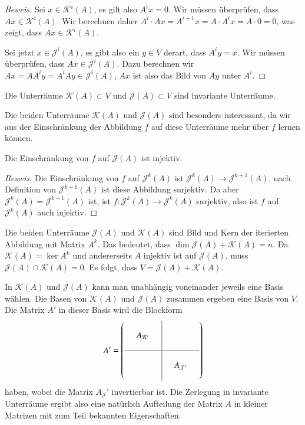 \begin{proof}[Beweis]
Sei $x\in\mathcal{K}^i(A)$, es gilt also $A^ix=0$.
Wir müssen überprüfen, dass $Ax\in\mathcal{K}^i(A)$.
Wir berechnen daher $A^i\cdot Ax=A^{i+1}x=A\cdot A^ix = A\cdot 0=0$,
was zeigt, dass $Ax\in\mathcal{K}^i(A)$.

Sei jetzt $x\in\mathcal{J}^i(A)$, es gibt also ein $y\in V$ derart, dass
$A^iy=x$.
Wir müssen überprüfen, dass $Ax\in\mathcal{J}^i(A)$.
Dazu berechnen wir $Ax=AA^iy=A^iAy\in\mathcal{J}^i(A)$, $Ax$ ist also das
Bild von $Ay$ unter $A^i$.
\end{proof}

\begin{korollar}
Die Unterräume $\mathcal{K}(A)\subset V$ und $\mathcal{J}(A)\subset V$
sind invariante Unterräume.
\end{korollar}

Die beiden Unterräume $\mathcal{K}(A)$ und $\mathcal{J}(A)$ sind besonders
interessant, da wir aus der Einschränkung der Abbildung $f$ auf diese
Unterräume mehr über $f$ lernen können.

\begin{satz}
\label{buch:eigenwerte:satz:fJinj}
Die Einschränkung von $f$ auf $\mathcal{J}(A)$ ist injektiv.
\end{satz}

\begin{proof}[Beweis]
Die Einschränkung von $f$ auf $\mathcal{J}^k(A)$ ist
$\mathcal{J}^k(A) \to \mathcal{J}^{k+1}(A)$, nach Definition von
$\mathcal{J}^{k+1}(A)$ ist diese Abbildung surjektiv.
Da aber $\mathcal{J}^k(A)=\mathcal{J}^{k+1}(A)$ ist, ist
$f\colon \mathcal{J}^k(A)\to\mathcal{J}^k(A)$ surjektiv,
also ist $f$ auf $\mathcal{J}^k(A)$ auch injektiv.
\end{proof}

Die beiden Unterräume $\mathcal{J}(A)$ und $\mathcal{K}(A)$
sind Bild und Kern der iterierten Abbildung mit Matrix $A^k$.
Das bedeutet, dass $\dim\mathcal{J}(A)+\mathcal{K}(A)=n$.
Da $\mathcal{K}(A)=\ker A^k$ und andererseits $A$ injektiv ist auf
$\mathcal{J}(A)$, muss $\mathcal{J}(A)\cap\mathcal{K}(A)=0$.
Es folgt, dass $V=\mathcal{J}(A) + \mathcal{K}(A)$.

In $\mathcal{K}(A)$ und $\mathcal{J}(A)$ kann man unabhängig voneinander
jeweils eine Basis wählen.
Die Basen von $\mathcal{K}(A)$ und $\mathcal{J}(A)$ zusammen ergeben
eine Basis von $V$.
Die Matrix $A'$ in dieser Basis wird die Blockform
\[
A'
=
\left(
\begin{array}{ccc|ccc}
&&&&&\\
&A_{\mathcal{K}'}&&&&\\
&&&&&\\
\hline
&&&&&\\
&&&&A_{\mathcal{J}'}&\\
&&&&&\\
\end{array}
\right)
\]
haben, wobei die Matrix $A_\mathcal{J}'$ invertierbar ist.
Die Zerlegung in invariante Unterräume ergibt also eine natürlich
Aufteilung der Matrix $A$ in kleiner Matrizen mit zum Teil bekannten
Eigenschaften.

